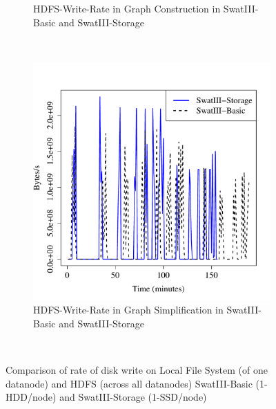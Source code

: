 \documentclass[conference]{IEEEtran}
\begin{document}
\begin{figure}[htb]
\begin{subfigure}[b]{0.23\textwidth}
                \caption{HDFS-Write-Rate in Graph Construction in SwatIII-Basic and SwatIII-Storage}
                \label{fig:BGHddSsdHdfsWrIops}
        \end{subfigure}
        ~ %
        \begin{subfigure}[b]{0.23\textwidth}
                \includegraphics[width=\textwidth]{Figure/SystemData/Plots/ECHddSsdHdfsWrIops.pdf}
                \caption{HDFS-Write-Rate in Graph Simplification in SwatIII-Basic and SwatIII-Storage}
                \label{fig:ECHddSsdHdfsWrIops}
        \end{subfigure}
        ~ %
        \caption{Comparison of rate of disk write on Local File System (of one datanode) and HDFS (across all datanodes) SwatIII-Basic (1-HDD/node) and SwatIII-Storage (1-SSD/node)}\label{fig:HddSsdHdfsRWps}
        
\end{figure}
\end{document}
